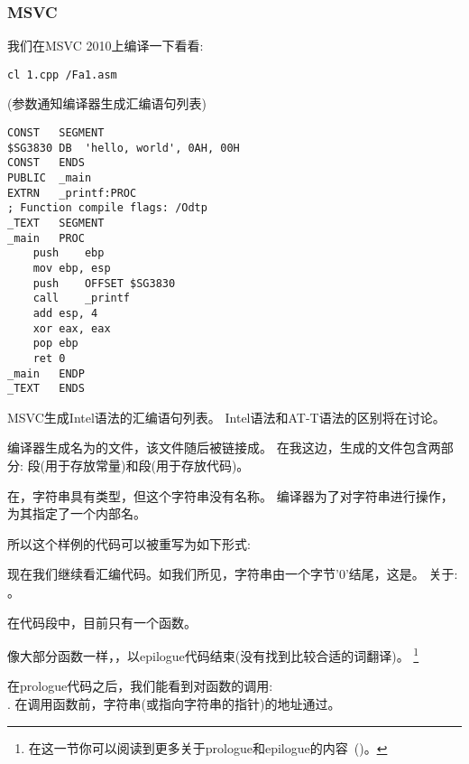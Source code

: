 \subsubsection{MSVC}

我们在MSVC 2010上编译一下看看:

\begin{lstlisting}
cl 1.cpp /Fa1.asm
\end{lstlisting}

(参数通知编译器生成汇编语句列表)

\begin{lstlisting}[caption=MSVC 2010,style=customasmx86]
CONST	SEGMENT
$SG3830	DB	'hello, world', 0AH, 00H
CONST	ENDS
PUBLIC	_main
EXTRN	_printf:PROC
; Function compile flags: /Odtp
_TEXT	SEGMENT
_main	PROC
	push	ebp
	mov	ebp, esp
	push	OFFSET $SG3830
	call	_printf
	add	esp, 4
	xor	eax, eax
	pop	ebp
	ret	0
_main	ENDP
_TEXT	ENDS
\end{lstlisting}

MSVC生成Intel语法的汇编语句列表。
Intel语法和AT-T语法的区别将在讨论。

编译器生成名为的文件，该文件随后被链接成。
在我这边，生成的文件包含两部分: 段(用于存放常量)和段(用于存放代码)。

\label{string_is_const_char}
在，字符串具有类型，但这个字符串没有名称。
编译器为了对字符串进行操作，为其指定了一个内部名。

所以这个样例的代码可以被重写为如下形式:



现在我们继续看汇编代码。如我们所见，字符串由一个字节'0'结尾，这是。
关于: 。

在代码段中，目前只有一个函数\main{}。

像大部分函数一样，，以epilogue代码结束(没有找到比较合适的词翻译)。
\footnote{在这一节你可以阅读到更多关于prologue和epilogue的内容~()。}

在prologue代码之后，我们能看到对\printf{}函数的调用:\\
.
在调用函数前，字符串(或指向字符串的指针)的地址通过。

